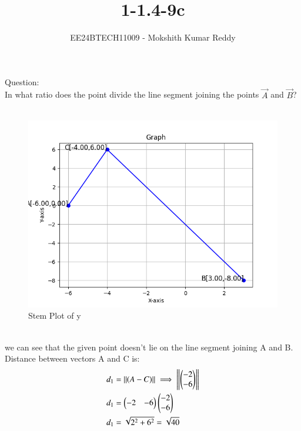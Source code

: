 \documentclass[journal]{IEEEtran}
\begin{document}

\vspace{3cm}

\title{1-1.4-9c}
\author{EE24BTECH11009 - Mokshith Kumar Reddy}
{\let\newpage\relax\maketitle}

\renewcommand{\thefigure}{\theenumi}
\renewcommand{\thetable}{\theenumi}
\setlength{\intextsep}{10pt} %


\renewcommand{\thetable}{\theenumi}
Question:\\
 In what ratio does the point  divide the line segment joining the points $\vec{A}$ and $\vec{B}$?\\
\solution\\
\begin{figure}[h!]
   \centering
   \includegraphics[width=0.7\linewidth]{figs/plot.png}
   \caption{Stem Plot of y}
   \label{stemplot}
\end{figure}\\
 we can see that the given point doesn't lie on the line segment joining A and B.\\
Distance between vectors A and C is:\\
\begin{align}
d_1&=\left\|{(A-C)}\right\|
 \implies \left\|\begin{pmatrix}-2\\-6\end{pmatrix}\right\|\\
d_1&=\begin{pmatrix}
-2 & -6
\end{pmatrix}
\begin{pmatrix}
-2\\
-6
\end{pmatrix}\\
d_1&=\sqrt{2^2+6^2}=\sqrt{40}\\
\end{align}
\end{document}
